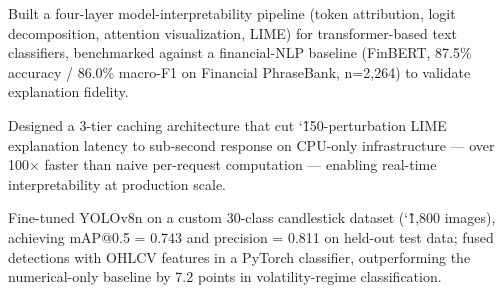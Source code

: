 \begin{resumeList}
    \item Built a four-layer model-interpretability pipeline (token attribution, logit decomposition, attention visualization, LIME) for transformer-based text classifiers, benchmarked against a financial-NLP baseline (FinBERT, 87.5\% accuracy / 86.0\% macro-F1 on Financial PhraseBank, n=2,264) to validate explanation fidelity.
    \item Designed a 3-tier caching architecture that cut \char`\~150-perturbation LIME explanation latency to sub-second response on CPU-only infrastructure --- over 100$\times$ faster than naive per-request computation --- enabling real-time interpretability at production scale.
\end{resumeList}

\begin{resumeList}
    \item Fine-tuned YOLOv8n on a custom 30-class candlestick dataset (\char`\~1,800 images), achieving mAP@0.5 = 0.743 and precision = 0.811 on held-out test data; fused detections with OHLCV features in a PyTorch classifier, outperforming the numerical-only baseline by 7.2 points in volatility-regime classification.
\end{resumeList}